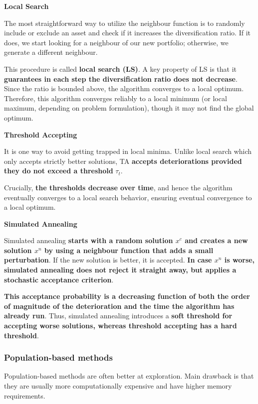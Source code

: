 \documentclass[12pt,a4paper]{article}
\begin{document}
\textbf{Local Search}

The most straightforward way to utilize the neighbour function is to randomly include or exclude an asset and check if it increases the diversification ratio. If it does, we start looking for a neighbour of our new portfolio; otherwise, we generate a different neighbour.

This procedure is called \textbf{local search (LS)}. A key property of LS is that it \textbf{guarantees in each step the diversification ratio does not decrease}. Since the ratio is bounded above, the algorithm converges to a local optimum. Therefore, this algorithm converges reliably to a local minimum (or local maximum, depending on problem formulation), though it may not find the global optimum.

\vspace{0.5em}

\textbf{Threshold Accepting}

It is one way to avoid getting trapped in local minima. Unlike local search which only accepts strictly better solutions, TA \textbf{accepts deteriorations provided they do not exceed a threshold} $\tau_t$. 

Crucially, \textbf{the thresholds decrease over time}, and hence the algorithm eventually converges to a local search behavior, ensuring eventual convergence to a local optimum.

\vspace{0.5em}

\textbf{Simulated Annealing}

Simulated annealing \textbf{starts with a random solution $x^c$ and creates a new solution $x^n$ by using a neighbour function that adds a small perturbation}. If the new solution is better, it is accepted. \textbf{In case $x^n$ is worse, simulated annealing does not reject it straight away, but applies a stochastic acceptance criterion}.

\textbf{This acceptance probability is a decreasing function of both the order of magnitude of the deterioration and the time the algorithm has already run}. Thus, simulated annealing introduces a \textbf{soft threshold for accepting worse solutions, whereas threshold accepting has a hard threshold}.

\subsubsection{Population-based methods}

Population-based methods are often better at exploration. Main drawback is that they are usually more computationally expensive and have higher memory requirements.
\end{document}
